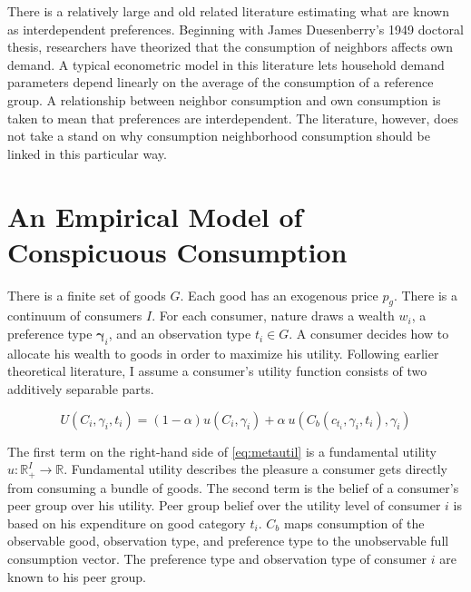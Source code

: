 There is a relatively large and old related literature estimating what are known as interdependent preferences.  Beginning with James Duesenberry's 1949 doctoral thesis,\citep{Duesenberry1949} researchers have theorized that the consumption of neighbors affects own demand.  A typical econometric model in this literature lets household demand parameters depend linearly on the average of the consumption of a reference group. A relationship between neighbor consumption and own consumption is taken to mean that preferences are interdependent.  The literature, however, does not take a stand on why consumption neighborhood consumption should be linked in this particular way.

\section{An Empirical Model of Conspicuous Consumption}

There is a finite set of goods $G$.  Each good has an exogenous price $p_g$.  There is a continuum of consumers $I$. For each consumer, nature draws a wealth $w_i$, a preference type $\boldsymbol{\gamma}_i$, and an observation type $t_i \in G$.  A consumer decides how to allocate his wealth to goods in order to maximize his utility.  Following earlier theoretical literature,\citep{Heffetz2011,Ireland1994} I assume a consumer's utility function consists of two additively separable parts.

\begin{equation}
    \label{eq:metautil}
    U(C_i,\gamma_i,t_i) = (1-\alpha) u(C_i,\gamma_i) + \alpha\  u(C_b(c_{t_i},\gamma_i,t_i),\gamma_i)
\end{equation}

The first term on the right-hand side of \eqref{eq:metautil} is a fundamental utility $u:\mathbb{R}_+^{I}\rightarrow\mathbb{R}$.  
Fundamental utility describes the pleasure a consumer gets directly from consuming a bundle of goods.
The second term is the belief of a consumer's peer group over his utility.  Peer group belief over the utility level of consumer $i$ is based on his expenditure on good category $t_i$.  $C_b$ maps consumption of the observable good, observation type, and preference type to the unobservable full consumption vector.  The preference type and observation type of consumer $i$ are known to his peer group.\footnotemark{}

